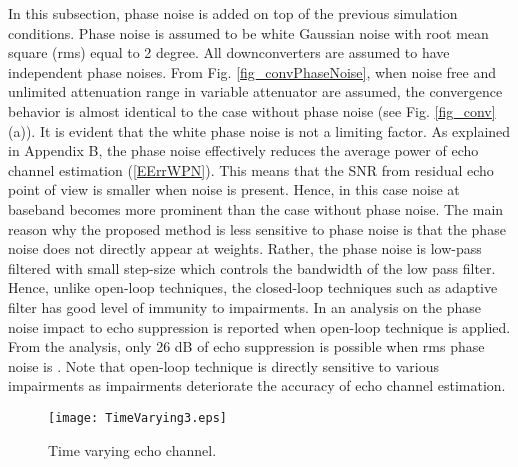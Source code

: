 \documentclass[twocolumn]{IEEEtran}
\begin{document}
In this subsection, phase noise is added on top of the previous
simulation conditions. Phase noise is assumed to be white Gaussian
noise with root mean square (rms) equal to 2 degree. All
downconverters are assumed to have independent phase noises. From
Fig. \ref{fig_convPhaseNoise}, when noise free and unlimited
attenuation range in variable attenuator are assumed, the
convergence behavior is almost identical to the case without phase
noise (see Fig. \ref{fig_conv} (a)). It is evident that the white
phase noise is not a limiting factor. As explained in Appendix B,
the phase noise effectively reduces the average power of echo
channel estimation (\ref{EErrWPN}). This means that the SNR from
residual echo point of view is smaller when noise is present. Hence,
in this case noise at baseband becomes more prominent than the case
without phase noise. The main reason why the proposed method is less
sensitive to phase noise is that the phase noise does not directly
appear at weights. Rather, the phase noise is low-pass filtered with
small step-size  which controls the bandwidth of the low pass
filter. Hence, unlike open-loop techniques, the closed-loop
techniques such as adaptive filter has good level of immunity to
impairments. In \cite{phasenoise} an analysis on the phase noise
impact to echo suppression is reported when open-loop technique is
applied. From the analysis, only 26 dB of echo suppression is
possible when rms phase noise is . Note that open-loop
technique is directly sensitive to various impairments as
impairments deteriorate the accuracy of echo channel estimation.

\begin{figure}[!t]

\centering
    {\texttt{[image: TimeVarying3.eps]}}


\caption{Time varying echo channel. \label{fig_tvh} }

\end{figure}
\end{document}
